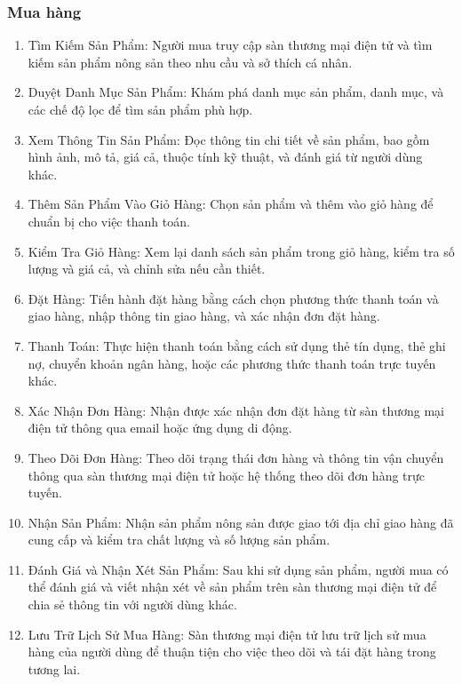         \subsubsection{Mua hàng}
        \begin{enumerate}
            \item Tìm Kiếm Sản Phẩm:
        Người mua truy cập sàn thương mại điện tử và tìm kiếm sản phẩm nông sản theo nhu cầu và sở thích cá nhân.
            \item Duyệt Danh Mục Sản Phẩm:
        Khám phá danh mục sản phẩm, danh mục, và các chế độ lọc để tìm sản phẩm phù hợp.
            \item Xem Thông Tin Sản Phẩm:
        Đọc thông tin chi tiết về sản phẩm, bao gồm hình ảnh, mô tả, giá cả, thuộc tính kỹ thuật, và đánh giá từ người dùng khác.
            \item Thêm Sản Phẩm Vào Giỏ Hàng:
        Chọn sản phẩm và thêm vào giỏ hàng để chuẩn bị cho việc thanh toán.
            \item Kiểm Tra Giỏ Hàng:
        Xem lại danh sách sản phẩm trong giỏ hàng, kiểm tra số lượng và giá cả, và chỉnh sửa nếu cần thiết.
            \item Đặt Hàng:
        Tiến hành đặt hàng bằng cách chọn phương thức thanh toán và giao hàng, nhập thông tin giao hàng, và xác nhận đơn đặt hàng.
            \item Thanh Toán:
        Thực hiện thanh toán bằng cách sử dụng thẻ tín dụng, thẻ ghi nợ, chuyển khoản ngân hàng, hoặc các phương thức thanh toán trực tuyến khác.
            \item Xác Nhận Đơn Hàng:
        Nhận được xác nhận đơn đặt hàng từ sàn thương mại điện tử thông qua email hoặc ứng dụng di động.
            \item Theo Dõi Đơn Hàng:
        Theo dõi trạng thái đơn hàng và thông tin vận chuyển thông qua sàn thương mại điện tử hoặc hệ thống theo dõi đơn hàng trực tuyến.
            \item Nhận Sản Phẩm:
        Nhận sản phẩm nông sản được giao tới địa chỉ giao hàng đã cung cấp và kiểm tra chất lượng và số lượng sản phẩm.
            \item Đánh Giá và Nhận Xét Sản Phẩm:
        Sau khi sử dụng sản phẩm, người mua có thể đánh giá và viết nhận xét về sản phẩm trên sàn thương mại điện tử để chia sẻ thông tin với người dùng khác.
            \item Lưu Trữ Lịch Sử Mua Hàng:
        Sàn thương mại điện tử lưu trữ lịch sử mua hàng của người dùng để thuận tiện cho việc theo dõi và tái đặt hàng trong tương lai.

\end{enumerate}
